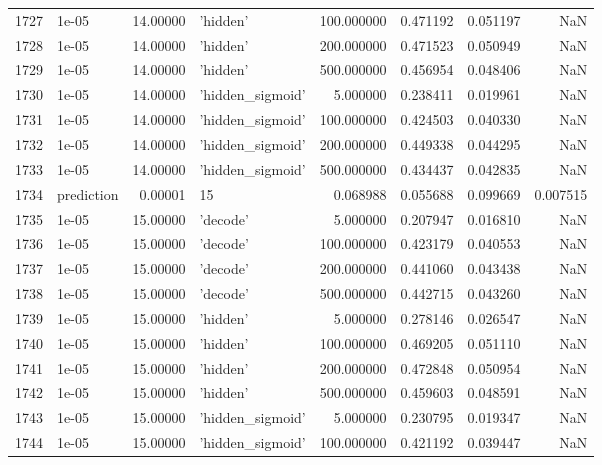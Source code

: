 \documentclass[10pt,a4paper]{article}
\begin{document}
\begin{tabular}{llrlrrrr}
1727 &       1e-05 &  14.00000 &           'hidden' &  100.000000 &  0.471192 &  0.051197 &       NaN \\
1728 &       1e-05 &  14.00000 &           'hidden' &  200.000000 &  0.471523 &  0.050949 &       NaN \\
1729 &       1e-05 &  14.00000 &           'hidden' &  500.000000 &  0.456954 &  0.048406 &       NaN \\
1730 &       1e-05 &  14.00000 &   'hidden\_sigmoid' &    5.000000 &  0.238411 &  0.019961 &       NaN \\
1731 &       1e-05 &  14.00000 &   'hidden\_sigmoid' &  100.000000 &  0.424503 &  0.040330 &       NaN \\
1732 &       1e-05 &  14.00000 &   'hidden\_sigmoid' &  200.000000 &  0.449338 &  0.044295 &       NaN \\
1733 &       1e-05 &  14.00000 &   'hidden\_sigmoid' &  500.000000 &  0.434437 &  0.042835 &       NaN \\
1734 &  prediction &   0.00001 &                 15 &    0.068988 &  0.055688 &  0.099669 &  0.007515 \\
1735 &       1e-05 &  15.00000 &           'decode' &    5.000000 &  0.207947 &  0.016810 &       NaN \\
1736 &       1e-05 &  15.00000 &           'decode' &  100.000000 &  0.423179 &  0.040553 &       NaN \\
1737 &       1e-05 &  15.00000 &           'decode' &  200.000000 &  0.441060 &  0.043438 &       NaN \\
1738 &       1e-05 &  15.00000 &           'decode' &  500.000000 &  0.442715 &  0.043260 &       NaN \\
1739 &       1e-05 &  15.00000 &           'hidden' &    5.000000 &  0.278146 &  0.026547 &       NaN \\
1740 &       1e-05 &  15.00000 &           'hidden' &  100.000000 &  0.469205 &  0.051110 &       NaN \\
1741 &       1e-05 &  15.00000 &           'hidden' &  200.000000 &  0.472848 &  0.050954 &       NaN \\
1742 &       1e-05 &  15.00000 &           'hidden' &  500.000000 &  0.459603 &  0.048591 &       NaN \\
1743 &       1e-05 &  15.00000 &   'hidden\_sigmoid' &    5.000000 &  0.230795 &  0.019347 &       NaN \\
1744 &       1e-05 &  15.00000 &   'hidden\_sigmoid' &  100.000000 &  0.421192 &  0.039447 &       NaN \\

\end{tabular}
\end{document}
